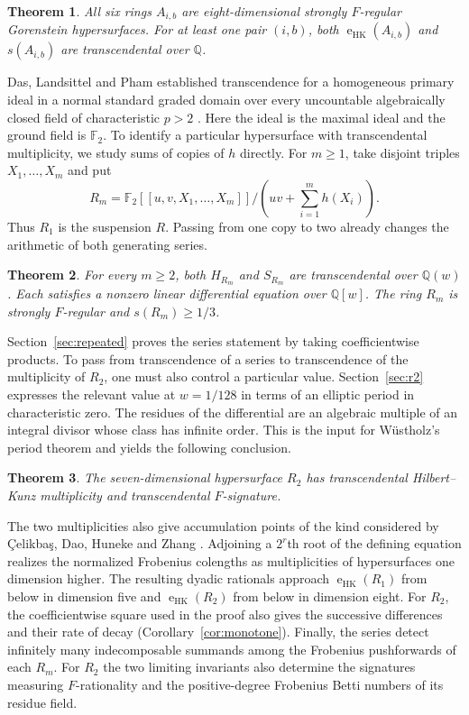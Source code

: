 \documentclass[11pt,a4paper,reqno]{amsart}
\numberwithin{equation}{section}
\theoremstyle{plain}
\newtheorem{mainresult}{Theorem}
\newcommand{\eHK}{\operatorname{e}_{\mathrm{HK}}}
\begin{document}
\begin{mainresult}\label{main:trans}
All six rings $A_{i,b}$ are eight-dimensional strongly $F$-regular Gorenstein hypersurfaces. For at least one pair $(i,b)$, both $\eHK(A_{i,b})$ and $s(A_{i,b})$ are transcendental over $\mathbb Q$.
\end{mainresult}

Das, Landsittel and Pham established transcendence for a homogeneous primary ideal in a normal standard graded domain over every uncountable algebraically closed field of characteristic $p>2$ \cite{DLP}. Here the ideal is the maximal ideal and the ground field is $\mathbb F_2$. To identify a particular hypersurface with transcendental multiplicity, we study sums of copies of $h$ directly. For $m\ge1$, take disjoint triples $X_1,\ldots,X_m$ and put
\[
 R_m=\mathbb F_2[[u,v,X_1,\ldots,X_m]]/
 \left(uv+\sum_{i=1}^m h(X_i)\right).
\]
Thus $R_1$ is the suspension $R$. Passing from one copy to two already changes the arithmetic of both generating series.

\begin{mainresult}\label{main:repeated}
For every $m\ge2$, both $H_{R_m}$ and $S_{R_m}$ are transcendental over $\mathbb Q(w)$. Each satisfies a nonzero linear differential equation over $\mathbb Q[w]$. The ring $R_m$ is strongly $F$-regular and $s(R_m)\ge1/3$.
\end{mainresult}

Section~\ref{sec:repeated} proves the series statement by taking coefficientwise products. To pass from transcendence of a series to transcendence of the multiplicity of $R_2$, one must also control a particular value. Section~\ref{sec:r2} expresses the relevant value at $w=1/128$ in terms of an elliptic period in characteristic zero. The residues of the differential are an algebraic multiple of an integral divisor whose class has infinite order. This is the input for W\"ustholz's period theorem and yields the following conclusion.

\begin{mainresult}\label{main:r2}
The seven-dimensional hypersurface $R_2$ has transcendental Hilbert--Kunz multiplicity and transcendental $F$-signature.
\end{mainresult}

The two multiplicities also give accumulation points of the kind considered by \c{C}elikba\c{s}, Dao, Huneke and Zhang \cite[p.~151]{CDHZ}. Adjoining a $2^r$th root of the defining equation realizes the normalized Frobenius colengths as multiplicities of hypersurfaces one dimension higher. The resulting dyadic rationals approach $\eHK(R_1)$ from below in dimension five and $\eHK(R_2)$ from below in dimension eight. For $R_2$, the coefficientwise square used in the proof also gives the successive differences and their rate of decay (Corollary~\ref{cor:monotone}). Finally, the series detect infinitely many indecomposable summands among the Frobenius pushforwards of each $R_m$. For $R_2$ the two limiting invariants also determine the signatures measuring $F$-rationality and the positive-degree Frobenius Betti numbers of its residue field.
\end{document}
